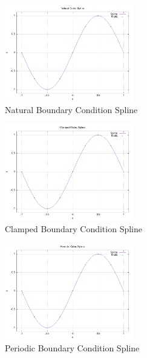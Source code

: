 \documentclass{article}
\begin{document}
\begin{figure}[H]
    \centering
    \includegraphics[width=0.5\textwidth]{../figure/Natural_spline_plot.png}
    \caption{Natural Boundary Condition Spline}
    \label{fig:natural}
\end{figure}

\begin{figure}[H]
    \centering
    \includegraphics[width=0.5\textwidth]{../figure/Clamped_spline_plot.png}
    \caption{Clamped Boundary Condition Spline}
    \label{fig:clamped}
\end{figure}

\begin{figure}[H]
    \centering
    \includegraphics[width=0.5\textwidth]{../figure/Periodic_spline_plot.png}
    \caption{Periodic Boundary Condition Spline}
    \label{fig:periodic}
\end{figure}
\end{document}

